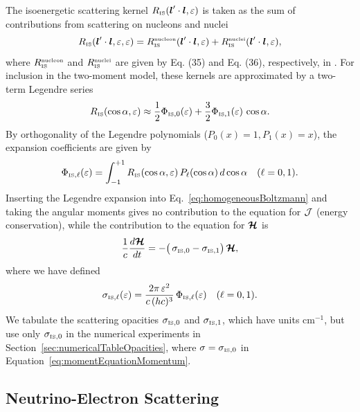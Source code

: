 \documentclass[10pt,preprint]{aastex}
\begin{document}
The isoenergetic scattering kernel $R_{\mbox{\tiny IS}}(\boldsymbol{l}'\cdot\boldsymbol{l},\varepsilon)$ is taken as the sum of contributions from scattering on nucleons and nuclei
\begin{equation}
  R_{\mbox{\tiny IS}}(\boldsymbol{l}'\cdot\boldsymbol{l},\varepsilon,\varepsilon) = R_{\mbox{\tiny IS}}^{\mbox{\tiny nucleon}}(\boldsymbol{l}'\cdot\boldsymbol{l},\varepsilon) + R_{\mbox{\tiny IS}}^{\mbox{\tiny nuclei}}(\boldsymbol{l}'\cdot\boldsymbol{l},\varepsilon),
\end{equation}
where $R_{\mbox{\tiny IS}}^{\mbox{\tiny nucleon}}$ and $R_{\mbox{\tiny IS}}^{\mbox{\tiny nuclei}}$ are given by Eq. (35) and Eq. (36), respectively, in \citet{mezzacappaBruenn_1993a}.  
For inclusion in the two-moment model, these kernels are approximated by a two-term Legendre series
\begin{align}
  R_{\mbox{\tiny IS}}(\cos\alpha,\varepsilon) \approx \frac{1}{2} \Phi_{\mbox{\tiny IS},0}(\varepsilon) + \frac{3}{2}\Phi_{\mbox{\tiny IS},1}(\varepsilon)\,\cos\alpha.
\end{align}
By orthogonality of the Legendre polynomials ($P_{0}(x)=1,P_{1}(x)=x$), the expansion coefficients are given by
\begin{equation}
  \Phi_{\mbox{\tiny IS},\ell}(\varepsilon)
  =\int_{-1}^{+1}R_{\mbox{\tiny IS}}(\cos\alpha,\varepsilon)\,P_{\ell}(\cos\alpha)\,d\cos\alpha \quad (\ell=0,1).  
\end{equation}
Inserting the Legendre expansion into Eq.~\eqref{eq:homogeneousBoltzmann} and taking the angular moments gives no contribution to the equation for $\mathcal{J}$ (energy conservation), while the contribution to the equation for $\boldsymbol{\mathcal{H}}$ is
\begin{equation}
  \frac{1}{c}\frac{d \boldsymbol{\mathcal{H}}}{d t}
  =-\big(\,\sigma_{\mbox{\tiny IS},0}-\sigma_{\mbox{\tiny IS},1}\big)\,\boldsymbol{\mathcal{H}},
\end{equation}
where we have defined
\begin{equation}
  \sigma_{\mbox{\tiny IS},\ell}(\varepsilon)
  =\frac{2\pi\,\varepsilon^{2}}{c\,(hc)^{3}}\,\Phi_{\mbox{\tiny IS},\ell}(\varepsilon) \quad (\ell=0,1).  
\end{equation}
We tabulate the scattering opacities $\sigma_{\mbox{\tiny IS},0}$ and $\sigma_{\mbox{\tiny IS},1}$, which have units cm$^{-1}$, but use only $\sigma_{\mbox{\tiny IS},0}$ in the numerical experiments in Section~\ref{sec:numericalTableOpacities}, where $\sigma=\sigma_{\mbox{\tiny IS},0}$ in Equation~\eqref{eq:momentEquationMomentum}.  

\subsection{Neutrino-Electron Scattering}
\end{document}
